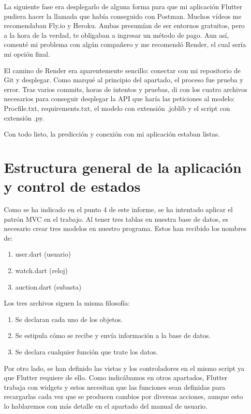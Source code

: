 	La siguiente fase era desplegarlo de alguna forma para que mi aplicación Flutter pudiera hacer la llamada que había conseguido con Postman. Muchos vídeos me recomendaban Fly.io y Heroku. Ambas presumían de ser entornos gratuitos, pero a la hora de la verdad, te obligaban a ingresar un método de pago. Aun así, comenté mi problema con algún compañero y me recomendó Render, el cual sería mi opción final.
	
	El camino de Render era aparentemente sencillo: conectar con mi repositorio de Git y desplegar. Como marqué al principio del apartado, el proceso fue prueba y error. Tras varios commits, horas de intentos y pruebas, di con los cuatro archivos necesarios para conseguir desplegar la API que haría las peticiones al modelo: Procfile.txt, requirements.txt, el modelo con extensión .joblib y el script con extensión .py.
	
	Con todo listo, la predicción y conexión con mi aplicación estaban listas.
	
\section{Estructura general de la aplicación y control de estados}
	
	Como se ha indicado en el punto 4 de este informe, se ha intentado aplicar el patrón MVC en el trabajo. Al tener tres tablas en nuestra base de datos, es necesario crear tres modelos en nuestro programa. Estos han recibido los nombres de:
	\begin{enumerate}
		\item user.dart (usuario)
		\item watch.dart (reloj)
		\item auction.dart (subasta)
	\end{enumerate}

	Los tres archivos siguen la misma filosofía:
	\begin{enumerate}
		\item Se declaran cada uno de los objetos.
		\item Se estipula cómo se recibe y envía información a la base de datos.
		\item Se declara cualquier función que trate los datos.
	\end{enumerate}
	
	Por otro lado, se han definido las vistas y los controladores en el mismo script ya que Flutter requiere de ello. Como indicábamos en otros apartados, Flutter trabaja con widgets y estos necesitan que las funciones sean definidas para recargarlas cada vez que se producen cambios por diversas acciones, aunque esto lo hablaremos con más detalle en el apartado del manual de usuario.
	
